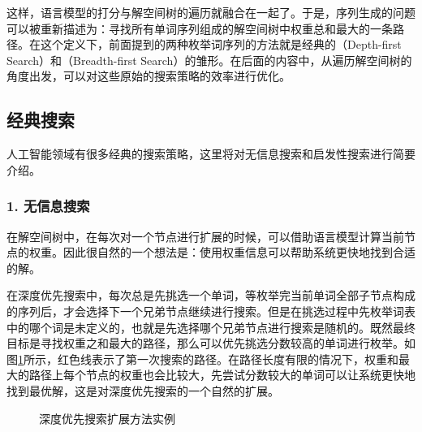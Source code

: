 \parinterval 这样，语言模型的打分与解空间树的遍历就融合在一起了。于是，序列生成的问题可以被重新描述为：寻找所有单词序列组成的解空间树中权重总和最大的一条路径。在这个定义下，前面提到的两种枚举词序列的方法就是经典的{\small{}}（Depth-first Search）和{\small{}}（Breadth-first Search）的雏形。在后面的内容中，从遍历解空间树的角度出发，可以对这些原始的搜索策略的效率进行优化。


\subsection{经典搜索}

\parinterval 人工智能领域有很多经典的搜索策略，这里将对无信息搜索和启发性搜索进行简要介绍。


\subsubsection{1. 无信息搜索}

\parinterval 在解空间树中，在每次对一个节点进行扩展的时候，可以借助语言模型计算当前节点的权重。因此很自然的一个想法是：使用权重信息可以帮助系统更快地找到合适的解。

\parinterval 在深度优先搜索中，每次总是先挑选一个单词，等枚举完当前单词全部子节点构成的序列后，才会选择下一个兄弟节点继续进行搜索。但是在挑选过程中先枚举词表中的哪个词是未定义的，也就是先选择哪个兄弟节点进行搜索是随机的。既然最终目标是寻找权重之和最大的路径，那么可以优先挑选分数较高的单词进行枚举。如图\ref{fig:2-15}所示，红色线表示了第一次搜索的路径。在路径长度有限的情况下，权重和最大的路径上每个节点的权重也会比较大，先尝试分数较大的单词可以让系统更快地找到最优解，这是对深度优先搜索的一个自然的扩展。

\begin{figure}[htp]
    \centering
 	
	\caption{深度优先搜索扩展方法实例}
    \label{fig:2-15}
\end{figure}

